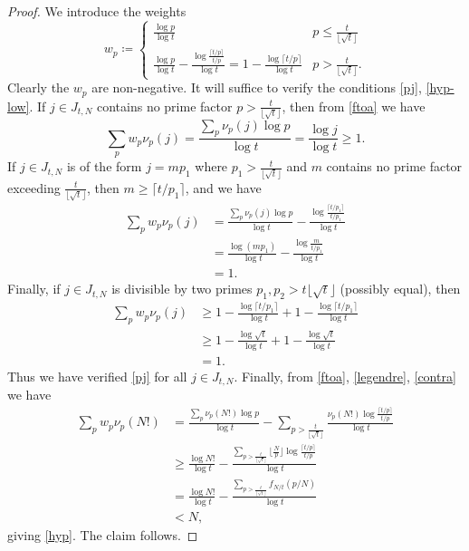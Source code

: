\documentclass[12pt,a4paper,reqno]{amsart}
\numberwithin{equation}{section}
\theoremstyle{plain}
\theoremstyle{definition}
\begin{document}
\begin{proof} We introduce the weights
  $$ 
w_p \coloneqq  \begin{cases} 
  \frac{\log p}{\log t} & p  \leq \frac{t}{\lfloor \sqrt{t} \rfloor} \\
  \frac{\log p}{\log t} - \frac{\log \frac{\lceil t/p \rceil}{t/p}}{\log t} = 1 - \frac{\log \lceil t/p \rceil}{\log t} & p  > \frac{t}{\lfloor \sqrt{t} \rfloor}.
\end{cases}
$$
Clearly the $w_p$ are non-negative.  It will suffice to verify the conditions \eqref{pj}, \eqref{hyp-low}.  If $j \in J_{t,N}$ contains no prime factor $p > \frac{t}{\lfloor \sqrt{t} \rfloor}$, then from \eqref{ftoa} we have
$$ \sum_p w_p \nu_p(j) = \frac{\sum_p \nu_p(j) \log p}{\log t} = \frac{\log j}{\log t} \geq 1.$$
If $j \in J_{t,N}$ is of the form $j = mp_1$ where $p_1 > \frac{t}{\lfloor \sqrt{t} \rfloor}$ and $m$ contains no prime factor exceeding $\frac{t}{\lfloor \sqrt{t} \rfloor}$, then $m \geq \lceil t/p_1 \rceil$, and we have
\begin{align*}
\sum_p w_p \nu_p(j) &= \frac{\sum_p \nu_p(j) \log p}{\log t}
- \frac{\log \frac{\lceil t/p_1 \rceil}{t/p_1}}{\log t}\\
&= \frac{\log(mp_1)}{\log t} -  \frac{\log \frac{m}{t/p_1}}{\log t} \\
&= 1.
\end{align*}
Finally, if $j \in J_{t,N}$ is divisible by two primes $p_1, p_2 > {t}{\lfloor \sqrt{t} \rfloor}$ (possibly equal), then
\begin{align*}
  \sum_p w_p \nu_p(j) &\geq
  1 - \frac{\log \lceil t/p_1 \rceil}{\log t} + 1 - \frac{\log \lceil t/p_1 \rceil}{\log t} \\
  &\geq
  1 - \frac{\log \sqrt{t}}{\log t} + 1 - \frac{\log \sqrt{t}}{\log t} \\
  &= 1.
\end{align*}
Thus we have verified \eqref{pj} for all $j \in J_{t,N}$.  Finally, from \eqref{ftoa}, \eqref{legendre}, \eqref{contra} we have
\begin{align*}
  \sum_p w_p \nu_p(N!) &= \frac{\sum_p \nu_p(N!) \log p}{\log t} - \sum_{p > \frac{t}{\lfloor \sqrt{t} \rfloor}} \frac{\nu_p(N!) \log \frac{\lceil t/p \rceil}{t/p}}{\log t} \\
  &\geq \frac{\log N!}{\log t} -  \frac{\sum_{p > \frac{t}{\lfloor \sqrt{t} \rfloor}} \lfloor \frac{N}{p} \rfloor \log \frac{\lceil t/p \rceil}{t/p}}{\log t}\\
  &= \frac{\log N!}{\log t} - \frac{\sum_{p > \frac{t}{\lfloor \sqrt{t} \rfloor}} f_{N/t}(p/N)}{\log t} \\
  &< N,
\end{align*}
giving \eqref{hyp}.  The claim follows.
\end{proof}
\end{document}
